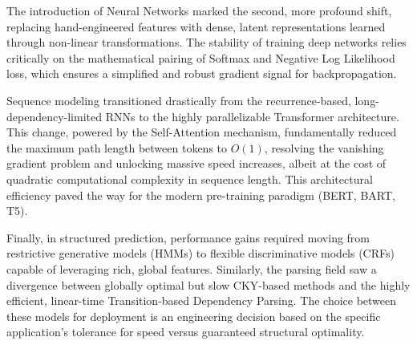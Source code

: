\documentclass{article}
\begin{document}
The introduction of Neural Networks marked the second, more profound shift, replacing hand-engineered features with dense, latent representations learned through non-linear transformations. The stability of training deep networks relies critically on the mathematical pairing of Softmax and Negative Log Likelihood loss, which ensures a simplified and robust gradient signal for backpropagation.

Sequence modeling transitioned drastically from the recurrence-based, long-dependency-limited RNNs to the highly parallelizable Transformer architecture. This change, powered by the Self-Attention mechanism, fundamentally reduced the maximum path length between tokens to $O(1)$, resolving the vanishing gradient problem and unlocking massive speed increases, albeit at the cost of quadratic computational complexity in sequence length. This architectural efficiency paved the way for the modern pre-training paradigm (BERT, BART, T5).

Finally, in structured prediction, performance gains required moving from restrictive generative models (HMMs) to flexible discriminative models (CRFs) capable of leveraging rich, global features. Similarly, the parsing field saw a divergence between globally optimal but slow CKY-based methods and the highly efficient, linear-time Transition-based Dependency Parsing. The choice between these models for deployment is an engineering decision based on the specific application's tolerance for speed versus guaranteed structural optimality.
\end{document}
